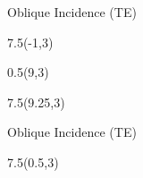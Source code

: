 \begin{lesson40}
\begin{frame}{Oblique Incidence (TE)}
\begin{textblock}{7.5}(-1,3) 
\scalebox{0.9}{
	
}
\end{textblock}

\begin{textblock}{0.5}(9,3)
	{\color{Blue4}{\rule{1.5pt}{2.8in}}}
\end{textblock}


\begin{textblock}{7.5}(9.25,3)
\begin{small}
\end{small}

\end{textblock}
\end{frame}


\begin{frame}{Oblique Incidence (TE)}
\begin{textblock}{7.5}(0.5,3) 
\begin{small}
\end{small}
\end{textblock}


\end{frame}
\end{lesson40}
